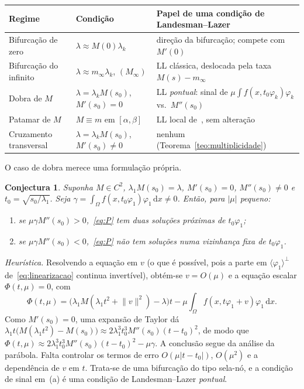 \documentclass[11pt,a4paper]{article}
\theoremstyle{plain}
\newtheorem{conjectura}[teorema]{Conjectura}
\theoremstyle{definition}
\theoremstyle{remark}
\newcommand{\norm}[1]{\lVert #1\rVert}
\newcommand{\abs}[1]{\lvert #1\rvert}
\newcommand{\dx}{\,\mathrm{d}x}
\begin{document}
\begin{center}
\small
\begin{tabular}{@{}L{3.3cm}L{4.4cm}L{6.2cm}@{}}
\toprule
\textbf{Regime} & \textbf{Condição} & \textbf{Papel de uma condição de Landesman--Lazer}\\
\midrule
Bifurcação de zero & $\lambda\approx M(0)\lambda_k$ & direção da bifurcação; compete com $M'(0)$\\
Bifurcação do infinito & $\lambda\approx m_\infty\lambda_k$, $(M_\infty)$ & LL clássica, deslocada pela taxa $M(s)-m_\infty$\\
Dobra de $M$ & $\lambda=\lambda_kM(s_0)$, $M'(s_0)=0$ & LL \emph{pontual}: sinal de $\mu\int f(x,t_0\varphi_k)\varphi_k$ vs.\ $M''(s_0)$\\
Patamar de $M$ & $M\equiv m$ em $[\alpha,\beta]$ & LL local de~\cite{RezendeSanchezSilva2019}, sem alteração\\
\midrule
Cruzamento transversal & $\lambda=\lambda_kM(s_0)$, $M'(s_0)\ne0$ & nenhum (Teorema~\ref{teo:multiplicidade})\\
\bottomrule
\end{tabular}
\end{center}

O caso de dobra merece uma formulação própria.

\begin{conjectura}\label{conj:dobra}
Suponha $M\in C^2$, $\lambda_1M(s_0)=\lambda$, $M'(s_0)=0$, $M''(s_0)\ne0$ e
$t_0=\sqrt{s_0/\lambda_1}$. Seja $\gamma=\int_\Omega f(x,t_0\varphi_1)\varphi_1\dx\ne0$.
Então, para $\abs{\mu}$ pequeno:
\begin{enumerate}[label=(\alph*),nosep]
\item se $\mu\gamma M''(s_0)>0$,~\eqref{eq:P} tem duas soluções próximas de
$t_0\varphi_1$;
\item se $\mu\gamma M''(s_0)<0$,~\eqref{eq:P} não tem soluções numa vizinhança
fixa de $t_0\varphi_1$.
\end{enumerate}
\end{conjectura}

\noindent\emph{Heurística.} Resolvendo a equação em $v$ (o que é possível,
pois a parte em $\langle\varphi_1\rangle^\perp$ de~\eqref{eq:linearizacao}
continua invertível), obtém-se $v=O(\mu)$ e a equação escalar
$\Phi(t,\mu)=0$, com
\[
\Phi(t,\mu)=\bigl(\lambda_1M(\lambda_1t^2+\norm{v}^2)-\lambda\bigr)t-\mu\int_\Omega f(x,t\varphi_1+v)\varphi_1\dx .
\]
Como $M'(s_0)=0$, uma expansão de Taylor dá
$\lambda_1t\bigl(M(\lambda_1t^2)-M(s_0)\bigr)\approx2\lambda_1^3t_0^3M''(s_0)(t-t_0)^2$, de
modo que $\Phi(t,\mu)\approx2\lambda_1^3t_0^3M''(s_0)(t-t_0)^2-\mu\gamma$. A
conclusão segue da análise da parábola. Falta controlar os termos de erro
$O(\mu\abs{t-t_0})$, $O(\mu^2)$ e a dependência de $v$ em $t$. Trata-se de uma
bifurcação do tipo sela-nó, e a condição de sinal em~(a) é uma condição de
Landesman--Lazer \emph{pontual}.
\end{document}
